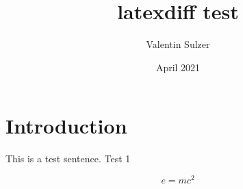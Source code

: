 \documentclass{article}
\title{latexdiff test}
\author{Valentin Sulzer}
\date{April 2021}
\begin{document}
\maketitle

\section{Introduction}

This is a test sentence.
Test 1

\begin{equation}
    e = mc^2
\end{equation}
\end{document}
